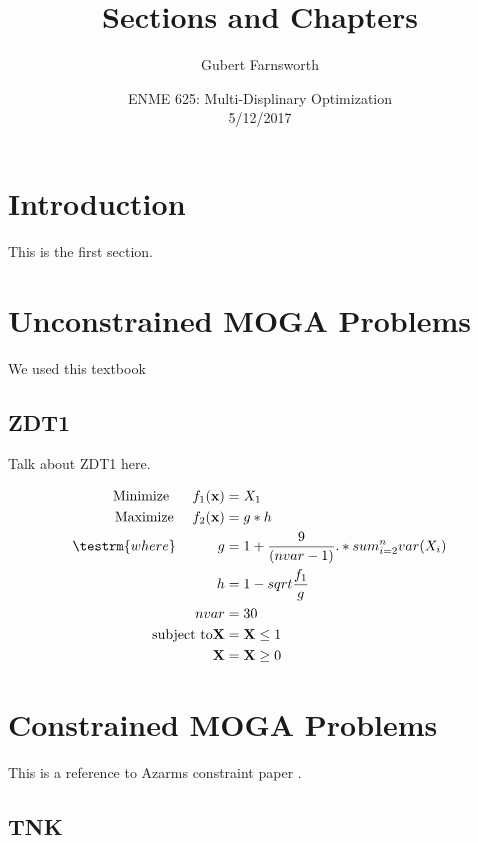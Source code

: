 \documentclass{article}
\title{Sections and Chapters}
\author{Gubert Farnsworth}
\date{ ENME 625: Multi-Displinary Optimization \\ 5/12/2017}
\begin{document}
 
\maketitle

\newpage
 
\tableofcontents
 
\newpage 
 
\section{Introduction}
 
This is the first section.
 

 
\section*{Unconstrained MOGA Problems}
We used this textbook \cite{deb2001multi}

\subsection{ ZDT1} 
Talk about ZDT1 here.  


\begin{align*}
\textrm{Minimize} ~~~~~ f_1(\textbf{x}) &= X_1 \\
\textrm{Maximize} ~~~~ f_2(\textbf{x}) &= g*h \\
\testrm{where} ~~~~~~~~~ g &= 1+\frac{9}{(nvar-1)}.*sum_{i=2}^nvar(X_i) \\
~~~~~~~~~ h &= 1- sqrt{\frac{f_1}{g}} \\
~~~~~~~~~ nvar &= 30 \\
\textrm{subject to} \textbf{X} &= \textbf{X} \leq 1 \\
\textbf{X} &= \textbf{X} \geq 0 \\
\end{align*}


\section{Constrained MOGA Problems}
This is a reference to Azarms constraint paper \cite{kurpati2002constraint}. %
 
\subsection{TNK}
\end{document}
